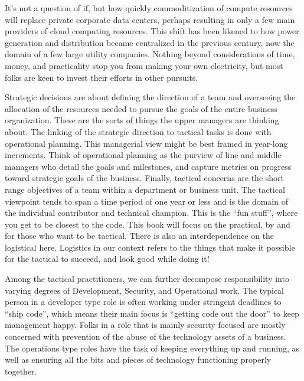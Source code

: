 \justify{}
It's not a question of if, but how quickly commoditization of compute resources
will replace private corporate data centers, perhaps resulting in only a
few main providers of cloud computing resources. This shift has been likened
to how power generation and distribution became centralized
in the previous century, now the domain of a few large utility companies.
Nothing beyond considerations of time, money, and practicality stop you
from making your own electricity, but most folks are keen to invest their
efforts in other pursuits.

\justify{}
Strategic decisions are about defining the direction of a team and overseeing
the allocation of the resources needed to pursue the goals of the entire
business organization. These are the sorts of things the upper managers are
thinking about. The linking of the strategic direction to tactical tasks is
done with operational planning. This managerial view might be best framed in
year-long increments. Think of operational planning as the purview of line
and middle managers who detail the goals and milestones, and capture metrics
on progress toward strategic goals of the business. Finally, tactical concerns
are the short range objectives of a team within a department or business unit.
The tactical viewpoint tends to span a time period of one year or less and is
the domain of the individual contributor and technical champion. This is the
``fun stuff'', where you get to be closest to the code. This book will focus
on the practical, by and for those who want to be tactical. There is also
an interdependence on the logistical here. Logistics in our context refers to
the things that make it possible for the tactical to succeed, and look good
while doing it!

\justify{}
Among the tactical practitioners, we can further decompose responsibility into
varying degrees of Development, Security, and Operational work. The typical
person in a developer type role is often working under stringent deadlines to
``ship code'', which means their main focus is ``getting code out the door'' to
keep management happy. Folks in a role that is mainly security focused are mostly
concerned with prevention of the abuse of the technology assets of a business. The
operations type roles have the task of keeping everything up and running, as well as
ensuring all the bits and pieces of technology functioning properly together.

